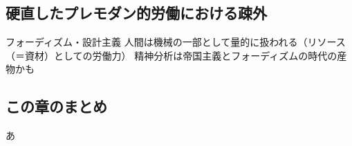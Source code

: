 \subsection{硬直したプレモダン的労働における疎外}\label{ux786cux76f4ux3057ux305fux30d7ux30ecux30e2ux30c0ux30f3ux7684ux52b4ux50cdux306bux304aux3051ux308bux758eux5916}

フォーディズム・設計主義
人間は機械の一部として量的に扱われる（リソース（＝資材）としての労働力）
精神分析は帝国主義とフォーディズムの時代の産物かも

\subsection{この章のまとめ}\label{ux3053ux306eux7ae0ux306eux307eux3068ux3081}

あ
